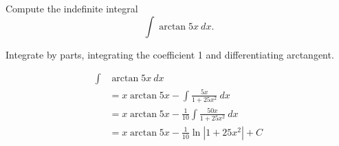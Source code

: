 \documentclass{ximera}
\begin{document}
\begin{question}%

Compute the indefinite integral 
\[\int \arctan 5x ~ dx.\]
\begin{multiplechoice}
\end{multiplechoice}
\begin{feedback}
Integrate by parts, integrating the coefficient 1 and differentiating arctangent.
\begin{hint}
\[\begin{aligned}
    \int & \arctan 5x ~ dx \\
    & = x \arctan 5x - \int \frac{5x}{1+25x^2} ~ dx \\
    & = x \arctan 5x - \frac{1}{10} \int \frac{50x}{1+25x^2} ~ dx \\
    & = x \arctan 5x - \frac{1}{10} \ln | 1 + 25x^2|  + C
\end{aligned}\]
\end{hint}
\end{feedback}

\end{question}
\end{document}
